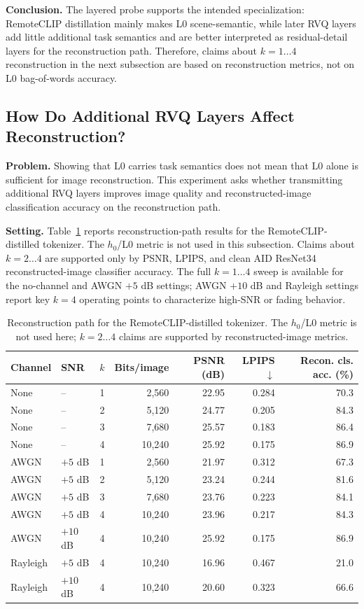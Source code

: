 \documentclass[lettersize,journal]{IEEEtran}
\begin{document}
\textbf{Conclusion.} The layered probe supports the intended specialization: RemoteCLIP distillation mainly makes L0 scene-semantic, while later RVQ layers add little additional task semantics and are better interpreted as residual-detail layers for the reconstruction path. Therefore, claims about $k=1\ldots4$ reconstruction in the next subsection are based on reconstruction metrics, not on L0 bag-of-words accuracy.

\subsection{How Do Additional RVQ Layers Affect Reconstruction?}
\textbf{Problem.} Showing that L0 carries task semantics does not mean that L0 alone is sufficient for image reconstruction. This experiment asks whether transmitting additional RVQ layers improves image quality and reconstructed-image classification accuracy on the reconstruction path.

\textbf{Setting.} Table~\ref{tab:recon_path} reports reconstruction-path results for the RemoteCLIP-distilled tokenizer. The $h_0$/L0 metric is not used in this subsection. Claims about $k=2\ldots4$ are supported only by PSNR, LPIPS, and clean AID ResNet34 reconstructed-image classifier accuracy. The full $k=1\ldots4$ sweep is available for the no-channel and AWGN $+5$ dB settings; AWGN $+10$ dB and Rayleigh settings report key $k=4$ operating points to characterize high-SNR or fading behavior.

\begin{table}[!t]
\centering
\caption{Reconstruction path for the RemoteCLIP-distilled tokenizer. The $h_0$/L0 metric is not used here; $k=2\ldots4$ claims are supported by reconstructed-image metrics.}
\label{tab:recon_path}
\begin{tabular}{@{}llrrrrr@{}}
\toprule
Channel & SNR & $k$ & Bits/image & PSNR (dB) & LPIPS $\downarrow$ & Recon. cls. acc. (\%) \\
\midrule
None & -- & 1 & 2{,}560 & 22.95 & 0.284 & 70.3 \\
None & -- & 2 & 5{,}120 & 24.77 & 0.205 & 84.3 \\
None & -- & 3 & 7{,}680 & 25.57 & 0.183 & 86.4 \\
None & -- & 4 & 10{,}240 & 25.92 & 0.175 & 86.9 \\
\midrule
AWGN & $+5$ dB & 1 & 2{,}560 & 21.97 & 0.312 & 67.3 \\
AWGN & $+5$ dB & 2 & 5{,}120 & 23.24 & 0.244 & 81.6 \\
AWGN & $+5$ dB & 3 & 7{,}680 & 23.76 & 0.223 & 84.1 \\
AWGN & $+5$ dB & 4 & 10{,}240 & 23.96 & 0.217 & 84.3 \\
AWGN & $+10$ dB & 4 & 10{,}240 & 25.92 & 0.175 & 86.9 \\
Rayleigh & $+5$ dB & 4 & 10{,}240 & 16.96 & 0.467 & 21.0 \\
Rayleigh & $+10$ dB & 4 & 10{,}240 & 20.60 & 0.323 & 66.6 \\
\bottomrule
\end{tabular}
\end{table}
\end{document}
